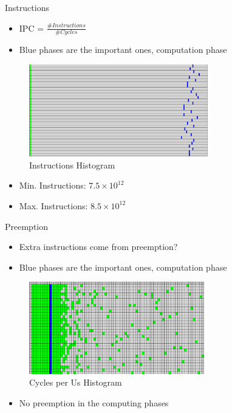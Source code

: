 \documentclass[aspectratio=169]{bredelebeamer}
\begin{document}
\begin{frame}{Instructions}

\begin{itemize}
\item IPC = $\frac{\#Instructions}{\#Cycles}$
\item Blue phases are the important ones, computation phase
\end{itemize}

\begin{figure}[h!]
  \centering
  \includegraphics[width=\textwidth,height=4cm,keepaspectratio]{"./img/one_step/instructions_histograma_4x4x2"}
  \caption*{Instructions Histogram}
\end{figure}

\begin{itemize}
\item Min. Instructions: $7.5\times10^{12}$
\item Max. Instructions: $8.5\times10^{12}$
\end{itemize}

\end{frame}


\begin{frame}{Preemption}

\begin{itemize}
\item Extra instructions come from preemption?
\item Blue phases are the important ones, computation phase
\end{itemize}

\begin{figure}[h!]
  \centering
  \includegraphics[width=\textwidth,height=4cm,keepaspectratio]{"./img/one_step/CYCLES-US_histograma_4x4x2"}
  \caption*{Cycles per Us Histogram}
\end{figure}

\begin{itemize}
\item No preemption in the computing phases
\end{itemize}

\end{frame}
\end{document}
